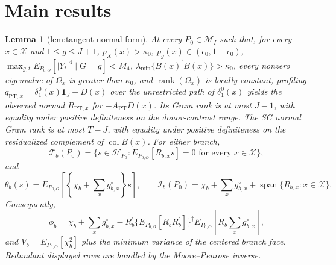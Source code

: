 \documentclass{article}
\newtheorem{lemma}{Lemma}
\begin{document}
\section{Main results}

\begin{lemma}[lem:tangent-normal-form]\label{lem:tangent-normal-form}
At every \(P_0\in\mathcal M_I\) such that, for every \(x\in\mathcal X\) and \(1\le g\le J+1\), \(p_X(x)>\kappa_0\), \(p_g(x)\in(\epsilon_0,1-\epsilon_0)\), \(\max_{g,t}E_{P_{0,O}}[|Y_t|^4\mid G=g]<M_4\), \(\lambda_{\min}\{B(x)^{\prime}B(x)\}>\kappa_0\), every nonzero eigenvalue of \(\Omega_x\) is greater than \(\kappa_0\), and \(\operatorname{rank}(\Omega_x)\) is locally constant, profiling \(q_{\mathrm{PT},x}=\delta_1^0(x)\mathbf 1_J-D(x)\) over the unrestricted path of \(\delta_1^0(x)\) yields the observed normal \(R_{\mathrm{PT},x}\) for \(-A_{\mathrm{PT}}D(x)\). Its Gram rank is at most \(J-1\), with equality under positive definiteness on the donor-contrast range. The SC normal Gram rank is at most \(T-J\), with equality under positive definiteness on the residualized complement of \(\operatorname{col}B(x)\). For either branch, \[\mathcal T_b(P_0)=\{s\in\mathcal H_{P_0}:E_{P_{0,O}}[R_{b,x}s]=0\text{ for every }x\in\mathcal X\},\] and \[\dot\theta_b(s)=E_{P_{0,O}}\!\left[\left\{\chi_b+\sum_xg^{\circ}_{b,x}\right\}s\right],\qquad \mathcal I_b(P_0)=\chi_b+\sum_xg^{\circ}_{b,x}+\operatorname{span}\{R_{b,x}:x\in\mathcal X\}.\] Consequently, \[\phi_b=\chi_b+\sum_xg^{\circ}_{b,x}-R_b^{\prime}\{E_{P_{0,O}}[R_bR_b^{\prime}]\}^{\dagger}E_{P_{0,O}}\!\left[R_b\sum_xg^{\circ}_{b,x}\right],\] and \(V_b=E_{P_{0,O}}[\chi_b^2]\) plus the minimum variance of the centered branch face. Redundant displayed rows are handled by the Moore--Penrose inverse.
\end{lemma}
\end{document}

